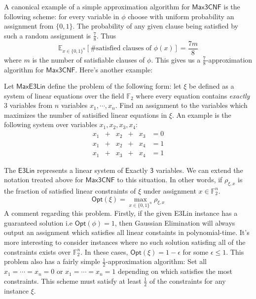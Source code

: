 A canonical example of a simple approximation algorithm for $\mathsf{Max3CNF}$ is the following scheme: for every variable in $\phi$ choose with uniform probability an assignment from $\{0,1\}$. The probability of any given clause being satisfied by such a random assignment is $\frac{7}{8}$. Thus
%
\[ \mathbb{E}_{x \in \{0,1\}^n}[\text{\# satisfied clauses of $\phi(x)$}] = \frac{7m}{8} \]
%
where $m$ is the number of satisfiable clauses of $\phi$. This gives us a $\frac{7}{8}$-approximation algorithm for $\mathsf{Max3CNF}$. Here's another example:
%
\begin{example}
  Let $\mathsf{MaxE3Lin}$ define the problem of the following form: let $\xi$ be defined as a system of linear equations over the field $\mathbb{F}_2$ where every equation contains \emph{exactly} $3$ variables from $n$ variables $x_1,\cdots,x_n$. Find an assignment to the variables which maximizes the number of satisified linear equations in $\xi$. An example is the following system over variables $x_1,x_2,x_3,x_4$:
  \begin{equation*}
    \begin{alignedat}{3}
      x_1 & +{} &  x_2 & +{} & x_3 & = 0 \\
      x_1 & +{} &  x_2 & +{} &  x_4 & = 1 \\
      x_1 & +{} & x_3 & +{} & x_4 & = 1
\end{alignedat}
\end{equation*}
\end{example}
%
The $\mathsf{E3Lin}$ represents a linear system of $\mathsf{E}$xactly $\mathsf{3}$ variables. We can extend the notation treated above for $\mathsf{Max3CNF}$ to this situation. In other words, if $\rho_{\xi,x}$ is the fraction of satisfied linear constraints of $\xi$ under assignment $x \in \mathbb{F}_2^n$.
%
\[\mathsf{Opt}(\xi) =\max_{x \in \{0,1\}^n}\rho_{\xi,x}\]
%
A comment regarding this problem. Firstly, if the given E3Lin instance has a guaranteed solution i.e $\mathsf{Opt}(\phi) = 1$, then Gaussian Elimination will always output an assignment which satisfies all linear constaints in polynomial-time. It's more interesting to consider instances where no such solution satisfing all of the constraints exists over $\mathbb{F}_2^n$. In these cases, $\mathsf{Opt}(\xi) = 1 - \epsilon$ for some $\epsilon \leq 1$. This problem also has a fairly simple $\frac{1}{2}$-approximation algorithm: Set all $x_1 = \cdots = x_n  = 0$ or $x_1 = \cdots = x_n  = 1$ depending on which satisfies the most constraints. This scheme must satisfy at least $\frac{1}{2}$ of the constraints for any instance $\xi$. \newline

